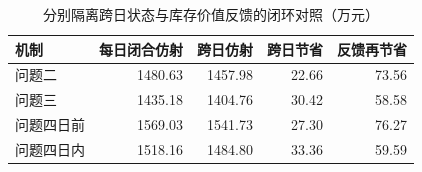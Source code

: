 \begin{table}[htbp]\centering\small
\caption{分别隔离跨日状态与库存价值反馈的闭环对照（万元）}
\begin{tabular}{lrrrr}
\toprule
机制 & 每日闭合仿射 & 跨日仿射 & 跨日节省 & 反馈再节省 \\
\midrule
问题二 & 1480.63 & 1457.98 & 22.66 & 73.56 \\
问题三 & 1435.18 & 1404.76 & 30.42 & 58.58 \\
问题四日前 & 1569.03 & 1541.73 & 27.30 & 76.27 \\
问题四日内 & 1518.16 & 1484.80 & 33.36 & 59.59 \\
\bottomrule\end{tabular}\end{table}
